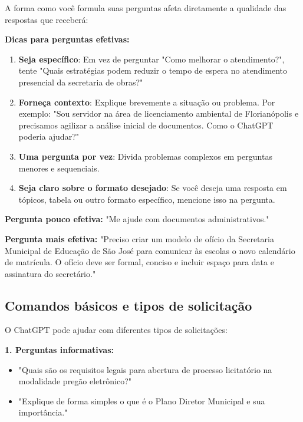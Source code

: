 \documentclass[12pt,a4paper]{book}
\begin{document}
A forma como você formula suas perguntas afeta diretamente a qualidade das respostas que receberá:

\textbf{Dicas para perguntas efetivas:}
\begin{enumerate}
    \item \textbf{Seja específico}: Em vez de perguntar "Como melhorar o atendimento?", tente "Quais estratégias podem reduzir o tempo de espera no atendimento presencial da secretaria de obras?"
    
    \item \textbf{Forneça contexto}: Explique brevemente a situação ou problema. Por exemplo: "Sou servidor na área de licenciamento ambiental de Florianópolis e precisamos agilizar a análise inicial de documentos. Como o ChatGPT poderia ajudar?"
    
    \item \textbf{Uma pergunta por vez}: Divida problemas complexos em perguntas menores e sequenciais.
    
    \item \textbf{Seja claro sobre o formato desejado}: Se você deseja uma resposta em tópicos, tabela ou outro formato específico, mencione isso na pergunta.
\end{enumerate}

\begin{tcolorbox}[exemplo]
\textbf{Pergunta pouco efetiva:}
"Me ajude com documentos administrativos."

\textbf{Pergunta mais efetiva:}
"Preciso criar um modelo de ofício da Secretaria Municipal de Educação de São José para comunicar às escolas o novo calendário de matrícula. O ofício deve ser formal, conciso e incluir espaço para data e assinatura do secretário."
\end{tcolorbox}

\subsection{Comandos básicos e tipos de solicitação}

O ChatGPT pode ajudar com diferentes tipos de solicitações:

\textbf{1. Perguntas informativas:}
\begin{itemize}
    \item "Quais são os requisitos legais para abertura de processo licitatório na modalidade pregão eletrônico?"
    \item "Explique de forma simples o que é o Plano Diretor Municipal e sua importância."
\end{itemize}
\end{document}
